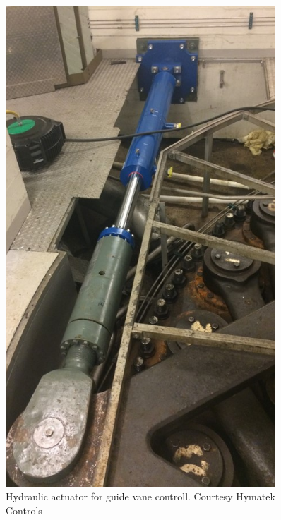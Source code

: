 \begin{figure}
\begin{minipage}[b]{0.5\linewidth}
                \includegraphics[width = 0.9\textwidth]{report/figures/introduction/servo1(1).jpg}
                \caption{Hydraulic actuator for guide vane controll. Courtesy Hymatek Controls}
                \label{fig:guide_vanes}
            \end{minipage}
        \end{figure}
        
